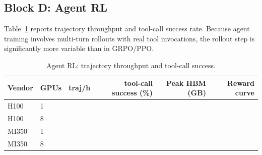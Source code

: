 \subsection{Block D: Agent RL}
\label{sec:training:agent}

Table~\ref{tab:agent} reports trajectory throughput and tool-call success rate.
Because agent training involves multi-turn rollouts with real tool invocations,
the rollout step is significantly more variable than in GRPO/PPO.

\begin{table}[h]
\centering
\caption{Agent RL: trajectory throughput and tool-call success.}
\label{tab:agent}
\small
\begin{tabular}{llrrrr}
\toprule
\textbf{Vendor} & \textbf{GPUs} &
\textbf{traj/h} & \textbf{tool-call success (\%)} &
\textbf{Peak HBM (GB)} & \textbf{Reward curve} \\
\midrule
H100  & 1 & \PH{} & \PH{} & \PH{} & \PH{} \\
H100  & 8 & \PH{} & \PH{} & \PH{} & \PH{} \\
MI350 & 1 & \PH{} & \PH{} & \PH{} & \PH{} \\
MI350 & 8 & \PH{} & \PH{} & \PH{} & \PH{} \\
\bottomrule
\end{tabular}
\end{table}
